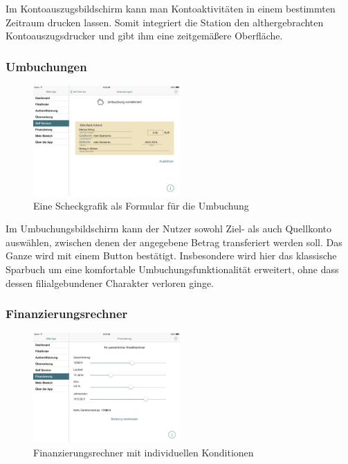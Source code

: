 	Im Kontoauszugsbildschirm kann man Kontoaktivitäten in einem bestimmten Zeitraum drucken lassen. Somit integriert die Station den althergebrachten Kontoauszugsdrucker und gibt ihm eine zeitgemäßere Oberfläche.

\subsubsection{Umbuchungen}
\begin{figure}[h]
	\centering
  \includegraphics[width=0.5\textwidth]{Pictures/umbuchung}
	\caption{Eine Scheckgrafik als Formular für die Umbuchung}
	\label{fig8}
\end{figure}

	Im Umbuchungsbildschirm kann der Nutzer sowohl Ziel- als auch Quellkonto auswählen, zwischen denen der angegebene Betrag transferiert werden soll. Das Ganze wird mit einem Button bestätigt. Insbesondere wird hier das klassische Sparbuch um eine komfortable Umbuchungsfunktionalität erweitert, ohne dass dessen filialgebundener Charakter verloren ginge.

\subsubsection{Finanzierungsrechner}
\begin{figure}[h]
	\centering
  \includegraphics[width=0.5\textwidth]{Pictures/finanzierung}
	\caption{Finanzierungsrechner mit individuellen Konditionen}
	\label{fig9}
\end{figure}

